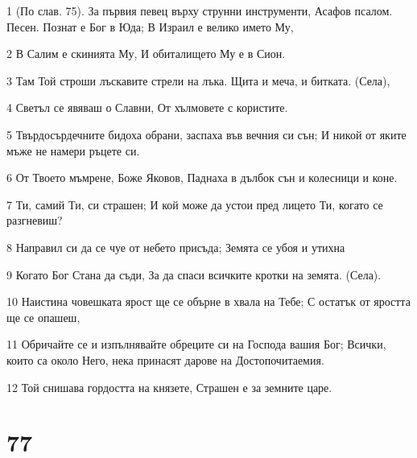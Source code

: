 \par 1 (По слав. 75). За първия певец върху струнни инструменти, Асафов псалом. Песен. Познат е Бог в Юда; В Израил е велико името Му,
\par 2 В Салим е скинията Му, И обиталището Му е в Сион.
\par 3 Там Той строши лъскавите стрели на лъка. Щита и меча, и битката. (Села),
\par 4 Светъл се явяваш о Славни, От хълмовете с користите.
\par 5 Твърдосърдечните бидоха обрани, заспаха във вечния си сън; И никой от яките мъже не намери ръцете си.
\par 6 От Твоето мъмрене, Боже Яковов, Паднаха в дълбок сън и колесници и коне.
\par 7 Ти, самий Ти, си страшен; И кой може да устои пред лицето Ти, когато се разгневиш?
\par 8 Направил си да се чуе от небето присъда; Земята се убоя и утихна
\par 9 Когато Бог Стана да съди, За да спаси всичките кротки на земята. (Села).
\par 10 Наистина човешката ярост ще се обърне в хвала на Тебе; С остатък от яростта ще се опашеш,
\par 11 Обричайте се и изпълнявайте обреците си на Господа вашия Бог; Всички, които са около Него, нека принасят дарове на Достопочитаемия.
\par 12 Той снишава гордостта на князете, Страшен е за земните царе.

\chapter{77}

